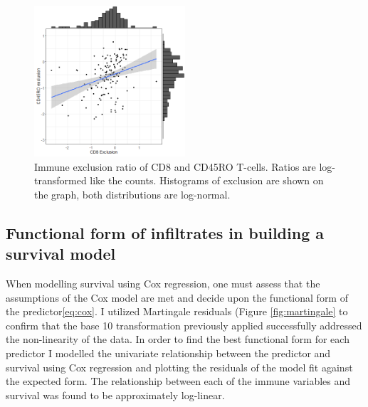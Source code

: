\begin{figure}
    \centering
    \includegraphics[width=0.5\textwidth]{Chapter2/Figs/Raster/Figurenew_ratio_scatter.png}
    \caption{Immune exclusion ratio of CD8 and CD45RO T-cells. Ratios are log-transformed like the counts. Histograms of exclusion are shown on the graph, both distributions are log-normal.}
    \label{fig:ratio}
\end{figure}



\subsection{Functional form of infiltrates in building a survival model}
When modelling survival using Cox regression, one must assess that the assumptions of the Cox model are met and decide upon the functional form of the predictor\ref{eq:cox}. I utilized Martingale residuals (Figure \ref{fig:martingale} to confirm that the base 10 transformation previously applied successfully addressed the non-linearity of the data. In order to find the best functional form for each predictor I modelled the univariate relationship between the predictor and survival using Cox regression and plotting the residuals of the model fit against the expected form. The relationship between each of the immune variables and survival was found to be approximately log-linear. 

